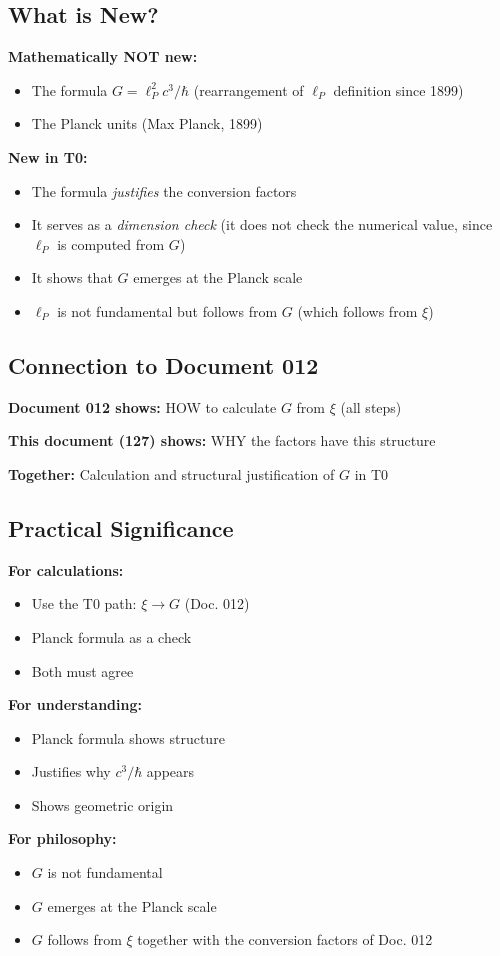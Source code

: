 	\subsection{What is New?}
	
	\textbf{Mathematically NOT new:}
	\begin{itemize}
		\item The formula $G = \ell_P^2 c^3/\hbar$ (rearrangement of $\ell_P$ definition since 1899)
		\item The Planck units (Max Planck, 1899)
	\end{itemize}
	
	\textbf{New in T0:}
	\begin{itemize}
		\item The formula \textit{justifies} the conversion factors
		\item It serves as a \textit{dimension check} (it does not check the numerical value, since $\ell_P$ is computed from $G$)
		\item It shows that $G$ emerges at the Planck scale
		\item $\ell_P$ is not fundamental but follows from $G$ (which follows from $\xi$)
	\end{itemize}
	
	\subsection{Connection to Document 012}
	
	\textbf{Document 012 shows:} HOW to calculate $G$ from $\xi$ (all steps)
	
	\textbf{This document (127) shows:} WHY the factors have this structure
	
	\textbf{Together:} Calculation and structural justification of $G$ in T0
	
	\subsection{Practical Significance}
	
	\textbf{For calculations:}
	\begin{itemize}
		\item Use the T0 path: $\xi \to G$ (Doc. 012)
		\item Planck formula as a check
		\item Both must agree
	\end{itemize}
	
	\textbf{For understanding:}
	\begin{itemize}
		\item Planck formula shows structure
		\item Justifies why $c^3/\hbar$ appears
		\item Shows geometric origin
	\end{itemize}
	
	\textbf{For philosophy:}
	\begin{itemize}
		\item $G$ is not fundamental
		\item $G$ emerges at the Planck scale
		\item $G$ follows from $\xi$ together with the conversion factors of Doc. 012
	\end{itemize}
	